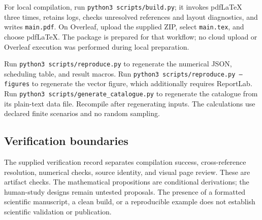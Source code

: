 For local compilation, run \texttt{python3 scripts/build.py}; it invokes pdfLaTeX three times, retains logs, checks unresolved references and layout diagnostics, and writes \texttt{main.pdf}. On Overleaf, upload the supplied ZIP, select \texttt{main.tex}, and choose pdfLaTeX. The package is prepared for that workflow; no cloud upload or Overleaf execution was performed during local preparation.

Run \texttt{python3 scripts/reproduce.py} to regenerate the numerical JSON, scheduling table, and result macros. Run \texttt{python3 scripts/reproduce.py --figures} to regenerate the vector figure, which additionally requires ReportLab. Run \texttt{python3 scripts/generate\_catalogue.py} to regenerate the catalogue from its plain-text data file. Recompile after regenerating inputs. The calculations use declared finite scenarios and no random sampling.

\subsection{Verification boundaries}
The supplied verification record separates compilation success, cross-reference resolution, numerical checks, source identity, and visual page review. These are artifact checks. The mathematical propositions are conditional derivations; the human-study designs remain untested proposals. The presence of a formatted scientific manuscript, a clean build, or a reproducible example does not establish scientific validation or publication.

